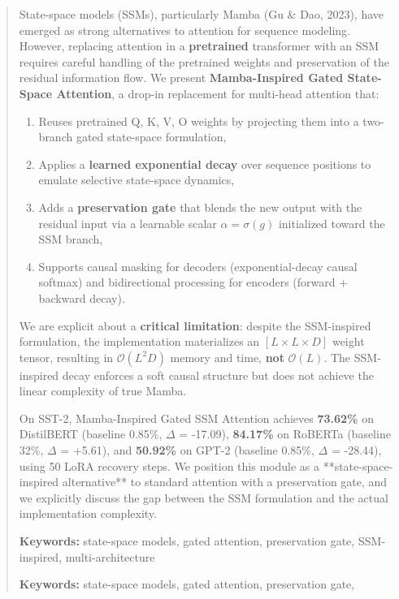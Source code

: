 \documentclass{article}
\begin{document}
\maketitle

\begin{abstract}
State-space models (SSMs), particularly Mamba (Gu \& Dao, 2023), have emerged 
as strong alternatives to attention for sequence modeling. However, replacing 
attention in a \textbf{pretrained} transformer with an SSM requires careful 
handling of the pretrained weights and preservation of the residual 
information flow. We present \textbf{Mamba-Inspired Gated State-Space Attention}, 
a drop-in replacement for multi-head attention that:

\begin{enumerate}
\item Reuses pretrained Q, K, V, O weights by projecting them into a two-branch
  gated state-space formulation,
\item Applies a \textbf{learned exponential decay} over sequence positions to
  emulate selective state-space dynamics,
\item Adds a \textbf{preservation gate} that blends the new output with the residual
  input via a learnable scalar $\alpha = \sigma(g)$ initialized toward the
  SSM branch,
\item Supports causal masking for decoders (exponential-decay causal softmax)
  and bidirectional processing for encoders (forward + backward decay).

\end{enumerate}
We are explicit about a \textbf{critical limitation}: despite the SSM-inspired 
formulation, the implementation materializes an $[L \times L \times D]$ 
weight tensor, resulting in $\mathcal{O}(L^2 D)$ memory and time, \textbf{not} 
$\mathcal{O}(L)$. The SSM-inspired decay enforces a soft causal structure 
but does not achieve the linear complexity of true Mamba.

On SST-2, Mamba-Inspired Gated SSM Attention achieves \textbf{73.62\%} on 
DistilBERT (baseline 0.85\%, $\Delta$ = -17.09), \textbf{84.17\%} on RoBERTa 
(baseline 32\%, $\Delta$ = +5.61), and \textbf{50.92\%} on GPT-2 
(baseline 0.85\%, $\Delta$ = -28.44), using 50 LoRA 
recovery steps. We position this module as a **state-space-inspired 
alternative** to standard attention with a preservation gate, and we 
explicitly discuss the gap between the SSM formulation and the actual 
implementation complexity.

\textbf{Keywords:} state-space models, gated attention, preservation gate, 
SSM-inspired, multi-architecture



\vspace{0.5em}
\noindent\textbf{Keywords:} state-space models, gated attention, preservation gate,
\end{abstract}
\end{document}
